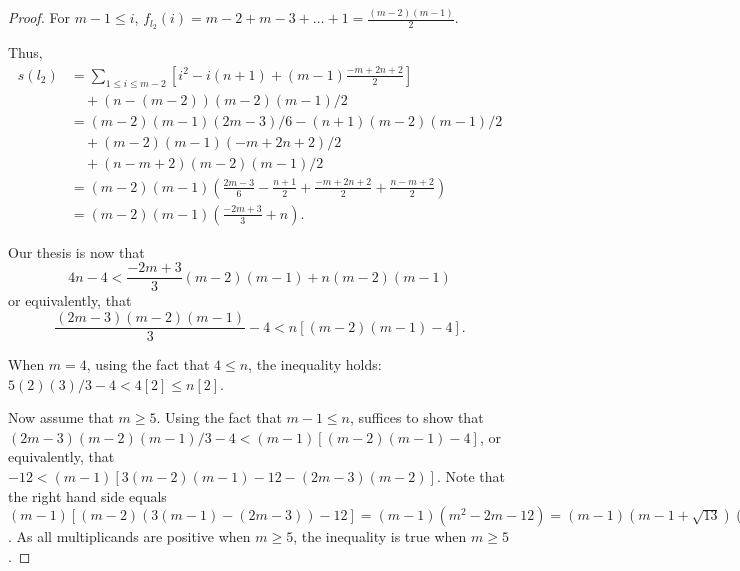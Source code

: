 \documentclass[version=3.21, pagesize, twoside=off, bibliography=totoc, DIV=calc, fontsize=12pt, a4paper]{scrartcl}
\begin{document}
\begin{proof}
	For $m - 1 ≤ i$, $f_{l_2}(i) = m - 2 + m - 3 + … + 1 = \frac{(m - 2) (m - 1)}{2}$.
	
	Thus, 
	\begin{align}
		s(l_2) &= \sum_{1 ≤ i ≤ m - 2}[i^2 - i (n + 1) + (m - 1) \frac{-m + 2n + 2}{2}] \\
		&\quad + (n - (m - 2)) (m - 2) (m - 1) / 2\\
		&= (m - 2) (m - 1) (2m - 3) / 6 - (n + 1) (m - 2) (m - 1) / 2 \\
		&\quad + (m - 2) (m - 1) (- m + 2n + 2) / 2 \\
		&\quad + (n - m + 2) (m - 2) (m - 1) / 2\\
		&= (m - 2) (m - 1) \left(\frac{2m - 3}{6} - \frac{n + 1}{2} + \frac{- m + 2n + 2}{2} + \frac{n - m + 2}{2}\right)\\
		&= (m - 2) (m - 1) \left(\frac{-2m + 3}{3} + n\right).
	\end{align}
	
	Our thesis is now that 
	\[4n - 4 < \frac{-2m + 3}{3} (m - 2) (m - 1) + n (m - 2) (m - 1)\]
	or equivalently, that 
	\[\frac{(2m - 3) (m - 2) (m - 1)}{3} - 4 < n [(m - 2) (m - 1) - 4].\]

	When $m = 4$, using the fact that $4 ≤ n$, the inequality holds: $5 (2) (3) / 3 - 4 < 4 [2] ≤ n [2]$.

	Now assume that $m ≥ 5$. Using the fact that $m - 1 ≤ n$, suffices to show that
	$(2m - 3) (m - 2) (m - 1) / 3 - 4 < (m - 1) [(m - 2) (m - 1) - 4]$, or equivalently, that
	$-12 < (m - 1) [3 (m - 2) (m - 1) - 12 - (2m - 3) (m - 2)]$.
	Note that the right hand side equals $(m - 1) [(m - 2) (3 (m - 1) - (2m - 3)) - 12] = (m - 1) (m^2 - 2m - 12) = (m - 1) (m - 1 + \sqrt{13}) (m - 1 - \sqrt{13})$. As all multiplicands are positive when $m ≥ 5$, the inequality is true when $m ≥ 5$.
\end{proof}		
\end{document}
